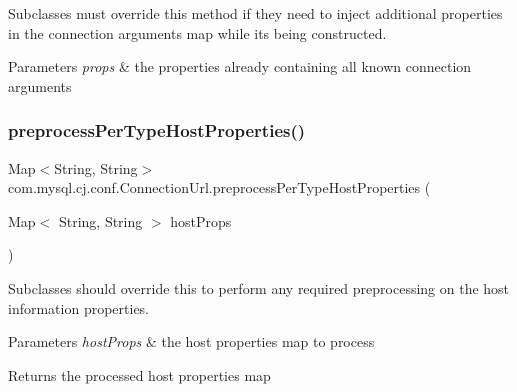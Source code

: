 Subclasses must override this method if they need to inject additional properties in the connection arguments map while it\textquotesingle{}s being constructed.


\begin{DoxyParams}{Parameters}
{\em props} & the properties already containing all known connection arguments \\
\hline
\end{DoxyParams}
\mbox{\label{classcom_1_1mysql_1_1cj_1_1conf_1_1_connection_url_a7fd201bea071685e2344dc0701b0fb21}} 
\subsubsection{\texorpdfstring{preprocess\+Per\+Type\+Host\+Properties()}{preprocessPerTypeHostProperties()}}
{\footnotesize\ttfamily Map$<$String, String$>$ com.\+mysql.\+cj.\+conf.\+Connection\+Url.\+preprocess\+Per\+Type\+Host\+Properties (\begin{DoxyParamCaption}\item[{Map$<$ String, String $>$}]{host\+Props }\end{DoxyParamCaption})\hspace{0.3cm}{\ttfamily [protected]}}

Subclasses should override this to perform any required preprocessing on the host information properties.


\begin{DoxyParams}{Parameters}
{\em host\+Props} & the host properties map to process \\
\hline
\end{DoxyParams}
\begin{DoxyReturn}{Returns}
the processed host properties map 
\end{DoxyReturn}
\mbox{\label{classcom_1_1mysql_1_1cj_1_1conf_1_1_connection_url_a30a037d919173bb9304abc41125093ce}} 
